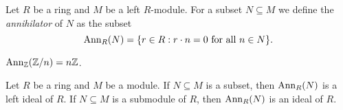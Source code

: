 %
%
%
%

Let $R$ be a ring and $M$ be a left $R$-module. For a 
subset $N\subseteq M$
we define the \emph{annihilator} of $N$ as the subset 
\[
\operatorname{Ann}_R(N)=\{r\in R:r\cdot n=0\text{ for all }n\in N\}.
\]

\begin{example}
	$\operatorname{Ann}_{\mathbb{Z}}(\mathbb{Z}/n)=n\mathbb{Z}$.
\end{example}

\begin{exercise}
    Let $R$ be a ring and $M$ be a module. If $N\subseteq M$ is a subset, then 
	$\operatorname{Ann}_R(N)$ is a left ideal of $R$. If $N\subseteq M$ is a submodule of $R$, then 
	$\operatorname{Ann}_R(N)$ is an ideal of $R$. 
\end{exercise}


	
